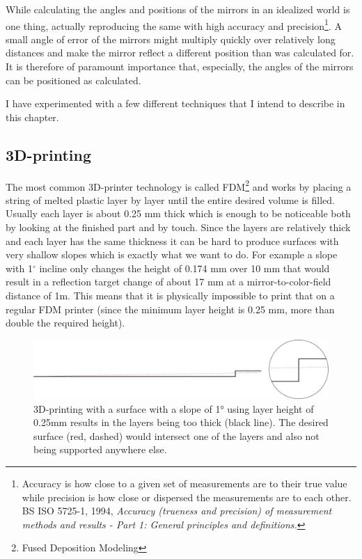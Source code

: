 \documentclass{article}
\begin{document}
While calculating the angles and positions of the mirrors in an
idealized world is one thing, actually reproducing the same with high
accuracy and precision\footnote{Accuracy is how close to a given set of
  measurements are to their true value while precision is how close or
  dispersed the measurements are to each other. BS ISO 5725-1, 1994,
  \emph{Accuracy (trueness and precision) of measurement methods and
  results - Part 1: General principles and definitions.}}. A small angle
of error of the mirrors might multiply quickly over relatively long
distances and make the mirror reflect a different position than was
calculated for. It is therefore of paramount importance that,
especially, the angles of the mirrors can be positioned as
calculated.

I have experimented with a few different techniques that I intend to
describe in this chapter.


\subsection{3D-printing}

The most common 3D-printer technology is called FDM\footnote{Fused
  Deposition Modeling} and works by placing a string of melted plastic
layer by layer until the entire desired volume is filled. Usually each
layer is about 0.25 mm thick which is enough to be noticeable both
by looking at the finished part and by touch. Since the layers are
relatively thick and each layer has the same thickness it can be hard to
produce surfaces with very shallow slopes which is exactly what we want
to do. For example a slope with 1$^{\circ}$ incline only changes the height of 0.174 mm over 10 mm that would result in a reflection target change of about 17 mm at a mirror-to-color-field distance of 1m. This means that it is physically impossible to print that on a regular FDM printer (since the minimum layer height is 0.25 mm, more than double the required height).


\begin{figure}[ht!]
\centering
\includegraphics{images/layer-lines-25mm.png}
\caption{3D-printing with a surface with a slope of 1° using layer height of 0.25mm results in the layers being too thick (black line). The desired surface (red, dashed) would intersect one of the layers and also not being supported anywhere else.}
\end{figure}
\end{document}
